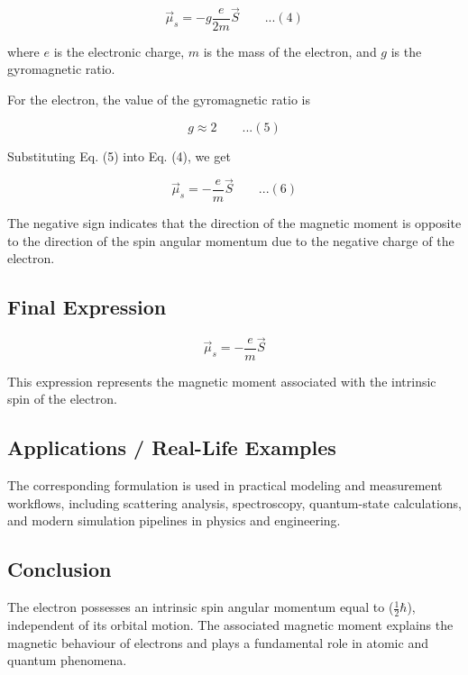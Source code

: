 \documentclass[12pt]{report}
\begin{document}
\begin{equation*}
\vec{\mu}_s = -g \frac{e}{2m} \vec{S}\qquad ...(4)
\end{equation*}

where $e$ is the electronic charge, $m$ is the mass of the electron, and $g$ is the gyromagnetic ratio.

For the electron, the value of the gyromagnetic ratio is

\begin{equation*}
g \approx 2 \qquad ...(5)
\end{equation*}

Substituting Eq. (5) into Eq. (4), we get

\begin{equation*}
\vec{\mu}_s = - \frac{e}{m} \vec{S}\qquad ...(6)
\end{equation*}

The negative sign indicates that the direction of the magnetic moment is opposite to the direction of the spin angular momentum due to the negative charge of the electron.

\subsection*{Final Expression}

\begin{equation*}
\boxed{\vec{\mu}_s = - \frac{e}{m} \vec{S}}
\end{equation*}

This expression represents the magnetic moment associated with the intrinsic spin of the electron.

\subsection*{Applications / Real-Life Examples}
The corresponding formulation is used in practical modeling and measurement workflows, including scattering analysis, spectroscopy, quantum-state calculations, and modern simulation pipelines in physics and engineering.

\subsection*{Conclusion}

The electron possesses an intrinsic spin angular momentum equal to ($\frac{1}{2}\hbar$), independent of its orbital motion. The associated magnetic moment explains the magnetic behaviour of electrons and plays a fundamental role in atomic and quantum phenomena.
\end{document}
